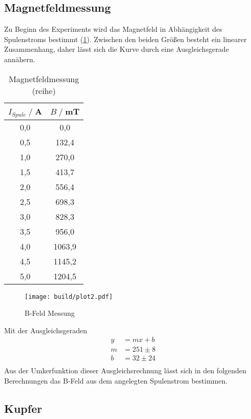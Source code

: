 \subsection{Magnetfeldmessung}
Zu Beginn des Experiments wird das Magnetfeld in Abhängigkeit des Spulenstroms bestimmt (\ref{tab:Br}).
Zwischen den beiden Größen besteht ein linearer Zusammenhang, daher lässt sich die Kurve durch eine Ausgleichsgerade annähern.
\begin{table}[H]
    \centering
    \begin{tabular}{c c}
        \toprule
        $I_{Spule} \;/\;$A & $B\;/\;$mT\\
        \midrule
        0,0                 &0,0\\
        0,5                 &132,4\\
        1,0                 &270,0\\
        1,5                 &413,7\\
        2,0                 &556,4\\  
        2,5                 &698,3\\
        3,0                 &828,3\\
        3,5                 &956,0\\
        4,0                 &1063,9\\
        4,5                 &1145,2\\
        5,0                 &1204,5\\
        \bottomrule
    \end{tabular}
    \caption{Magnetfeldmessung (reihe)}
    \label{tab:Br}
\end{table}
\begin{figure}[H]
    \centering
    \texttt{[image: build/plot2.pdf]}
    \caption{B-Feld Messung}
    \label{fig:Br}
\end{figure}
Mit der Ausgleichsgeraden
\begin{align*}
    y &= mx + b\\
    m &= 251\pm 8\\  
    b &= 32\pm 24\\
\end{align*}
Aus der Umkerfunktion dieser Ausgleichsrechnung lässt sich in den folgenden Berechnungen das B-Feld aus dem angelegten Spulenstrom bestimmen.
\subsection{Kupfer}

